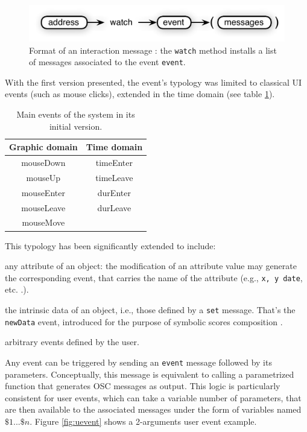 \documentclass{article}
\newcommand{\OSC}[1]	{{\fontsize{8.5pt}{8pt} \selectfont\texttt{#1}}}
\let\olditemize\itemize
\let\oldenditemize\enditemize
\renewenvironment{itemize} 	{\olditemize \renewcommand{\labelitemi}{$\bullet$} \setlength{\itemsep}{0mm}}{\oldenditemize}
\begin{document}
\begin{figure}[htbp]
\centerline{
	\includegraphics[width=0.95\columnwidth]{imgs/watch}}
\caption{Format of an interaction message : the \OSC{watch} method installs a list of messages associated to the event \OSC{event}.}
\label{fig:watch}
\end{figure}

With the first version presented, the event's typology was limited to classical UI events (such as mouse clicks), extended in the time domain (see table \ref{tbl:evts}). 

\begin{table}[htp]
\begin{center}
\begin{tabular}{c|c}
Graphic domain & Time domain \\
\hline
mouseDown 		& timeEnter	\\
mouseUp			& timeLeave	\\
mouseEnter		& durEnter		\\
mouseLeave		& durLeave		\\
mouseMove		&				\\
\end{tabular}
\end{center}
\caption{Main events of the system in its initial version.}
\label{tbl:evts}
\end{table}%

This typology has been significantly extended to include:
\begin{itemize}
\item any attribute of an object: the modification of an attribute value may generate the corresponding event, that carries the name of the attribute (e.g., \OSC{x, y date}, etc. .).
\item the intrinsic data of an object, i.e., those defined by a \OSC{set} message. That's the \OSC{newData} event, introduced for the purpose of symbolic scores composition \cite{Lepetit-Aimon_tenor2016}.
\item arbitrary events defined by the user.
\end{itemize}

Any event can be triggered by sending an \OSC{event} message followed by its parameters. Conceptually, this message  is equivalent to calling a 
parametrized function that generates OSC messages as output.
This logic is particularly consistent for user events, which can take a variable number of parameters, that are then available to the associated messages under the form of variables named $\$1 ... \$n$. Figure \ref{fig:uevent} shows a 2-arguments user event example.
\end{document}
